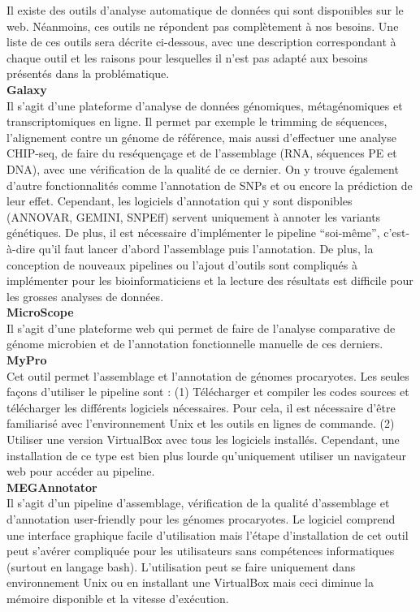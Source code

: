 Il existe des outils d’analyse automatique de données qui sont disponibles sur le web. Néanmoins, ces outils ne répondent pas complètement à nos besoins. Une liste de ces outils sera décrite ci-dessous, avec une description correspondant à chaque outil et les raisons pour lesquelles il n’est pas adapté aux besoins présentés dans la problématique. 
\\[0.4cm]
\textbf{Galaxy}\\
Il s’agit d’une plateforme d’analyse de données génomiques, métagénomiques et transcriptomiques en ligne. Il permet par exemple le trimming de séquences, l’alignement contre un génome de référence, mais aussi d’effectuer une analyse CHIP-seq, de faire du reséquençage et de l’assemblage (RNA, séquences PE et DNA), avec une vérification de la qualité de ce dernier. On y trouve également d’autre fonctionnalités comme l’annotation de SNPs et ou encore la prédiction de leur effet. Cependant, les logiciels d’annotation qui y sont disponibles (ANNOVAR, GEMINI, SNPEff) servent uniquement à annoter les variants génétiques. De plus, il est nécessaire d’implémenter le pipeline “soi-même”, c’est-à-dire qu’il faut lancer d’abord l’assemblage puis l’annotation. De plus, la conception de nouveaux pipelines ou l’ajout d’outils sont compliqués à implémenter pour les bioinformaticiens et la lecture des résultats est difficile pour les grosses analyses de données.
\\[0.4cm]
\textbf{MicroScope}\\
Il s’agit d’une plateforme web qui permet de faire de l’analyse comparative de génome microbien et de l’annotation fonctionnelle manuelle de ces derniers.
\\[0.4cm]
\textbf{MyPro}\\
Cet outil permet l’assemblage et l’annotation de génomes procaryotes. Les seules façons d’utiliser le pipeline sont : (1) Télécharger et compiler les codes sources et télécharger les différents logiciels nécessaires. Pour cela, il est nécessaire d’être familiarisé avec l’environnement Unix et les outils en lignes de commande. (2) Utiliser une version VirtualBox avec tous les logiciels installés. Cependant, une installation de ce type est bien plus lourde qu’uniquement utiliser un navigateur web pour accéder au pipeline.
\\[0.4cm]
\textbf{MEGAnnotator}\\
Il s’agit d’un pipeline d’assemblage, vérification de la qualité d’assemblage et d’annotation user-friendly pour les génomes procaryotes. Le logiciel comprend une interface graphique facile d’utilisation mais l’étape d’installation de cet outil peut s’avérer compliquée pour les utilisateurs sans compétences informatiques (surtout en langage bash). L’utilisation peut se faire uniquement dans environnement Unix ou en installant une VirtualBox mais ceci diminue la mémoire disponible et la vitesse d'exécution.



